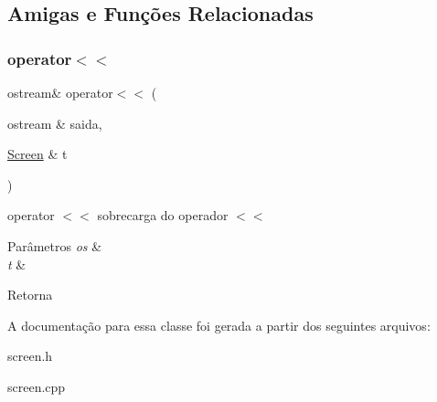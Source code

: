 \subsection{Amigas e Funções Relacionadas}
\mbox{\label{class_screen_aade3857efd573e64caa202f30e8927b3}} 
\subsubsection{\texorpdfstring{operator$<$$<$}{operator<<}}
{\footnotesize\ttfamily ostream\& operator$<$$<$ (\begin{DoxyParamCaption}\item[{ostream \&}]{saida,  }\item[{\mbox{\hyperlink{class_screen}{Screen}} \&}]{t }\end{DoxyParamCaption})\hspace{0.3cm}{\ttfamily [friend]}}



operator $<$$<$ sobrecarga do operador $<$$<$ 


\begin{DoxyParams}{Parâmetros}
{\em os} & \\
\hline
{\em t} & \\
\hline
\end{DoxyParams}
\begin{DoxyReturn}{Retorna}

\end{DoxyReturn}


A documentação para essa classe foi gerada a partir dos seguintes arquivos\+:\begin{DoxyCompactItemize}
\item 
screen.\+h\item 
screen.\+cpp\end{DoxyCompactItemize}
